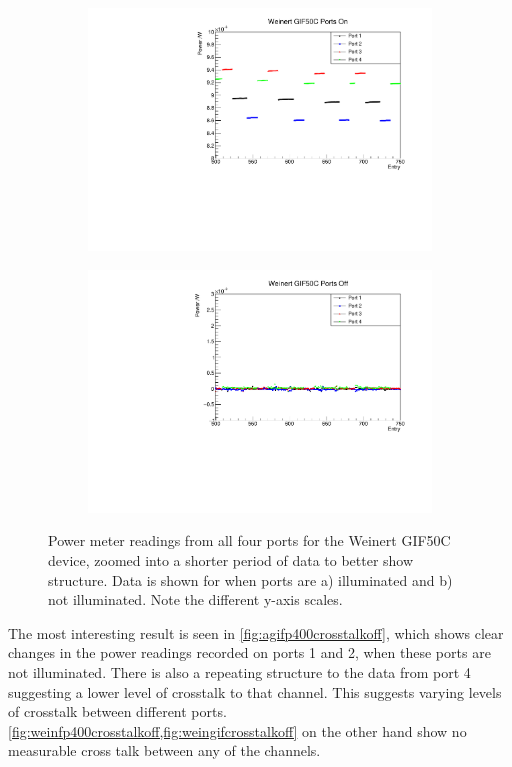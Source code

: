 \documentclass[a4paper,11pt]{article}
\begin{document}
\begin{figure}[h!]
\centering
\begin{subfigure}{0.5\textwidth}
\includegraphics[width=\linewidth]{WeinertGIF50CPortsOnZoom.pdf}
\subcaption{}\label{fig:weingifcrosstalkon}
\end{subfigure}%
\begin{subfigure}{0.5\textwidth}
\includegraphics[width=\linewidth]{WeinertGIF50CPortsOffZoom.pdf}
\subcaption{}\label{fig:weingifcrosstalkoff}
\end{subfigure}
\caption{Power meter readings from all four ports for the Weinert GIF50C device, zoomed into a shorter period of data to better show structure. Data is shown for when ports are a) illuminated and b) not illuminated. Note the different y-axis scales.}\label{fig:weingifcrosstalk}
\end{figure}
The most interesting result is seen in \cref{fig:agifp400crosstalkoff}, which shows clear changes in the power readings recorded on ports 1 and 2, when these ports are not illuminated. There is also a repeating structure to the data from port 4 suggesting a lower level of crosstalk to that channel. This suggests varying levels of crosstalk between different ports. \cref{fig:weinfp400crosstalkoff,fig:weingifcrosstalkoff} on the other hand show no measurable cross talk between any of the channels.
\end{document}
